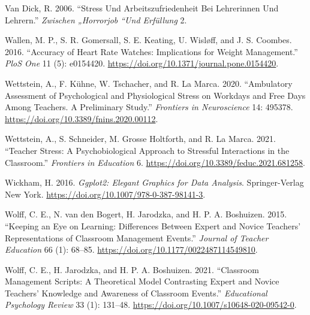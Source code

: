 \documentclass[preprint,
3p]{elsarticle} %
\newlength{\cslhangindent}
\newenvironment{CSLReferences}[2] %
 {\begin{list}{}{%
  \setlength{\itemindent}{0pt}
  \setlength{\leftmargin}{0pt}
  \setlength{\parsep}{0pt}
  \ifodd #1
   \setlength{\leftmargin}{\cslhangindent}
   \setlength{\itemindent}{-1\cslhangindent}
  \fi
  \setlength{\itemsep}{#2\baselineskip}}}
 {\end{list}}
\begin{document}
\begin{CSLReferences}{1}{0}
Van Dick, R. 2006. {``Stress Und Arbeitszufriedenheit Bei Lehrerinnen
Und Lehrern.''} \emph{Zwischen „Horrorjob ``Und Erf{ü}llung} 2.

Wallen, M. P., S. R. Gomersall, S. E. Keating, U. Wisløff, and J. S.
Coombes. 2016. {``Accuracy of Heart Rate Watches: Implications for
Weight Management.''} \emph{PloS One} 11 (5): e0154420.
\url{https://doi.org/10.1371/journal.pone.0154420}.

Wettstein, A., F. Kühne, W. Tschacher, and R. La Marca. 2020.
{``Ambulatory Assessment of Psychological and Physiological Stress on
Workdays and Free Days Among Teachers. A Preliminary Study.''}
\emph{Frontiers in Neuroscience} 14: 495378.
\url{https://doi.org/10.3389/fnins.2020.00112}.

Wettstein, A., S. Schneider, M. Grosse Holtforth, and R. La Marca. 2021.
{``Teacher {Stress}: {A} {Psychobiological} {Approach} to {Stressful}
{Interactions} in the {Classroom}.''} \emph{Frontiers in Education} 6.
\url{https://doi.org/10.3389/feduc.2021.681258}.

Wickham, H. 2016. \emph{Ggplot2: Elegant Graphics for Data Analysis}.
Springer-Verlag New York.
\url{https://doi.org/10.1007/978-0-387-98141-3}.

Wolff, C. E., N. van den Bogert, H. Jarodzka, and H. P. A. Boshuizen.
2015. {``Keeping an Eye on Learning: Differences Between Expert and
Novice Teachers' Representations of Classroom Management Events.''}
\emph{Journal of Teacher Education} 66 (1): 68--85.
\url{https://doi.org/10.1177/0022487114549810}.

Wolff, C. E., H. Jarodzka, and H. P. A. Boshuizen. 2021. {``Classroom
Management Scripts: A Theoretical Model Contrasting Expert and Novice
Teachers' Knowledge and Awareness of Classroom Events.''}
\emph{Educational Psychology Review} 33 (1): 131--48.
\url{https://doi.org/10.1007/s10648-020-09542-0}.

\end{CSLReferences}
\end{document}
